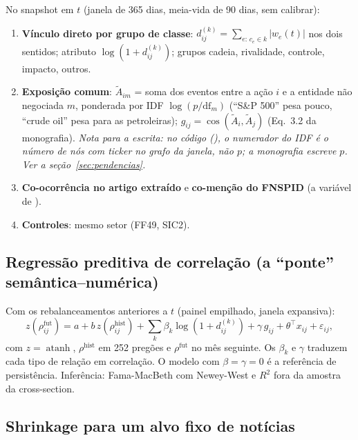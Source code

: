 \documentclass[11pt,a4paper]{article}
\newcommand{\nota}[1]{\textcolor{blue!60!black}{\textit{Nota para a escrita: #1}}}
\begin{document}
No snapshot em $t$ (janela de 365 dias, meia-vida de 90 dias, sem calibrar):
\begin{enumerate}
  \item \textbf{Vínculo direto por grupo de classe}: $d^{(k)}_{ij}=\sum_{e:\,c_e\in k}|w_e(t)|$ nos dois
        sentidos; atributo $\log(1+d^{(k)}_{ij})$; grupos cadeia, rivalidade, controle, impacto, outros.
  \item \textbf{Exposição comum}: $\tilde A_{im}$ = soma dos eventos entre a ação $i$ e a entidade não
        negociada $m$, ponderada por IDF $\log(p/\mathrm{df}_m)$ (``S\&P 500'' pesa pouco, ``crude
        oil'' pesa para as petroleiras); $g_{ij}=\cos(\tilde A_i,\tilde A_j)$ (Eq.~3.2 da monografia).
        \nota{no código (), o numerador do IDF é o número de nós com
        ticker no grafo da janela, não $p$; a monografia escreve $p$. Ver a seção~\ref{sec:pendencias}.}
  \item \textbf{Co-ocorrência no artigo extraído} e \textbf{co-menção do FNSPID} (a variável de
        \citealt{tang2019}).
  \item \textbf{Controles}: mesmo setor (FF49, SIC2).
\end{enumerate}

\subsection{Regressão preditiva de correlação (a ``ponte'' semântica--numérica)}

Com os rebalanceamentos anteriores a $t$ (painel empilhado, janela expansiva):
\[
z(\rho^{\text{fut}}_{ij}) = a + b\,z(\rho^{\text{hist}}_{ij}) + \sum_k\beta_k\log(1+d^{(k)}_{ij})
 + \gamma\, g_{ij} + \theta^\top x_{ij} + \varepsilon_{ij},
\]
com $z=\operatorname{atanh}$, $\rho^{\text{hist}}$ em 252 pregões e $\rho^{\text{fut}}$ no mês seguinte.
Os $\beta_k$ e $\gamma$ traduzem cada tipo de relação em correlação. O modelo com $\beta=\gamma=0$
é a referência de persistência. Inferência: Fama-MacBeth com Newey-West e $R^2$ fora da amostra da
cross-section.

\subsection{Shrinkage para um alvo fixo de notícias}
\end{document}
